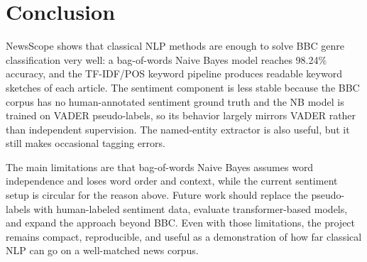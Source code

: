 \section{Conclusion}
\label{sec:conclusion}

NewsScope shows that classical NLP methods are enough to solve BBC genre classification very well: a bag-of-words Naive Bayes model reaches 98.24\% accuracy, and the TF-IDF/POS keyword pipeline produces readable keyword sketches of each article. The sentiment component is less stable because the BBC corpus has no human-annotated sentiment ground truth and the NB model is trained on VADER pseudo-labels, so its behavior largely mirrors VADER rather than independent supervision. The named-entity extractor is also useful, but it still makes occasional tagging errors.

The main limitations are that bag-of-words Naive Bayes assumes word independence and loses word order and context, while the current sentiment setup is circular for the reason above. Future work should replace the pseudo-labels with human-labeled sentiment data, evaluate transformer-based models, and expand the approach beyond BBC. Even with those limitations, the project remains compact, reproducible, and useful as a demonstration of how far classical NLP can go on a well-matched news corpus.
